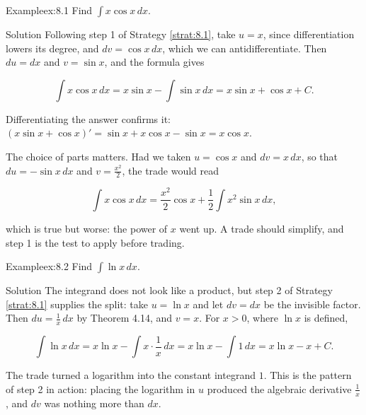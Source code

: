 \documentclass[a4paper,12pt,oneside]{memoir}
\begin{document}
\begin{workedexample}
\begin{envexample}{Example}{ex:8.1}{}
Find \(\displaystyle\int x\cos x\,dx\).
\end{envexample}
\begin{envsolution}{Solution}{}{}
Following step 1 of Strategy \ref{strat:8.1}, take \(u = x\), since differentiation lowers its degree, and \(dv = \cos x\,dx\), which we can antidifferentiate. Then \(du = dx\) and \(v = \sin x\), and the formula gives

\[ \int x\cos x\,dx = x\sin x - \int \sin x\,dx = x\sin x + \cos x + C. \]

Differentiating the answer confirms it: \((x\sin x + \cos x)' = \sin x + x\cos x - \sin x = x\cos x\).

The choice of parts matters. Had we taken \(u = \cos x\) and \(dv = x\,dx\), so that \(du = -\sin x\,dx\) and \(v = \tfrac{x^{2}}{2}\), the trade would read

\[ \int x\cos x\,dx = \frac{x^{2}}{2}\cos x + \frac{1}{2}\int x^{2}\sin x\,dx, \]

which is true but worse: the power of \(x\) went up. A trade should simplify, and step 1 is the test to apply before trading. \qedmark
\end{envsolution}
\end{workedexample}
\begin{workedexample}
\begin{envexample}{Example}{ex:8.2}{}
Find \(\displaystyle\int \ln x\,dx\).
\end{envexample}
\begin{envsolution}{Solution}{}{}
The integrand does not look like a product, but step 2 of Strategy \ref{strat:8.1} supplies the split: take \(u = \ln x\) and let \(dv = dx\) be the invisible factor. Then \(du = \tfrac{1}{x}\,dx\) by Theorem 4.14, and \(v = x\). For \(x > 0\), where \(\ln x\) is defined,

\[ \int \ln x\,dx = x\ln x - \int x\cdot\frac{1}{x}\,dx = x\ln x - \int 1\,dx = x\ln x - x + C. \]

The trade turned a logarithm into the constant integrand \(1\). This is the pattern of step 2 in action: placing the logarithm in \(u\) produced the algebraic derivative \(\tfrac{1}{x}\), and \(dv\) was nothing more than \(dx\). \qedmark
\end{envsolution}
\end{workedexample}
\end{document}
